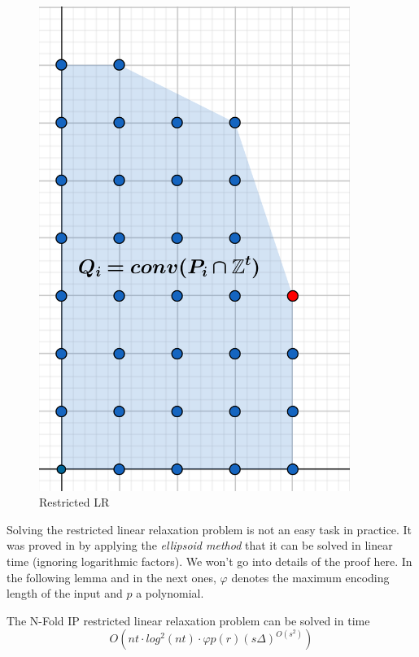 \begin{figure}[h]
\begin{minipage}[b]{0.45\textwidth}
    \includegraphics[width=0.9\textwidth]{images/IP(3).png}
    \caption{Restricted LR}
\end{minipage}
\end{figure}

Solving the restricted linear relaxation problem is not an easy task in practice. It was proved in \cite{EISENBRAND:2020} by applying the \emph{ellipsoid method} that it can be solved in linear time (ignoring logarithmic factors). We won't go into details of the proof here. In the following lemma and in the next ones, $\varphi$ denotes the maximum encoding length of the input and $p$ a polynomial.

\begin{lemma}
    The N-Fold IP restricted linear relaxation problem can be solved in time
    \vspace{-5pt}
    \begin{equation*}
        O(nt \cdot log^2(nt) \cdot \varphi p(r) (s\Delta)^{O(s^2)})
    \end{equation*}
\end{lemma}

